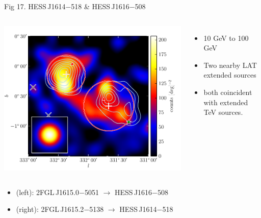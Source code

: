 \documentclass[12pt]{beamer}
\begin{document}
\begin{frame}{Fig 17. HESS\,J1614$-$518 \& HESS\,J1616$-$508}
  \begin{columns}
    \includegraphics[scale=0.5]{plots/source_HESS_J1614-518_color.pdf}
    \begin{itemize}
      \item 10 GeV to 100 GeV
      \item Two nearby LAT extended sources 
      \item both
        coincident with extended TeV sources.
    \end{itemize}
  \end{columns}

  \begin{itemize}
    \item (left): 
      2FGL\,J1615.0$-$5051 $\rightarrow$ HESS\,J1616$-$508
    \item (right):
      2FGL\,J1615.2$-$5138 $\rightarrow$ HESS\,J1614$-$518
  \end{itemize}

\end{frame}
\end{document}

